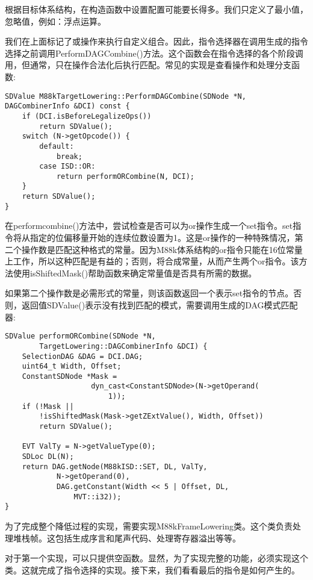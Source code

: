 根据目标体系结构，在构造函数中设置配置可能要长得多。我们只定义了最小值，忽略值，例如：浮点运算。\par

我们在上面标记了或操作来执行自定义组合。因此，指令选择器在调用生成的指令选择之前调用PerformDAGCombine()方法。这个函数会在指令选择的各个阶段调用，但通常，只在操作合法化后执行匹配。常见的实现是查看操作和处理分支函数:\par

\begin{lstlisting}[caption={}]
SDValue M88kTargetLowering::PerformDAGCombine(SDNode *N,
DAGCombinerInfo &DCI) const {
	if (DCI.isBeforeLegalizeOps())
		return SDValue();
	switch (N->getOpcode()) {
		default:
			break;
		case ISD::OR:
			return performORCombine(N, DCI);
	}
	return SDValue();
}
\end{lstlisting}

在performcombine()方法中，尝试检查是否可以为or操作生成一个set指令。set指令将从指定的位偏移量开始的连续位数设置为1。这是or操作的一种特殊情况，第二个操作数是匹配这种格式的常量。因为M88k体系结构的or指令只能在16位常量上工作，所以这种匹配是有益的；否则，将合成常量，从而产生两个or指令。该方法使用isShiftedMask()帮助函数来确定常量值是否具有所需的数据。\par

如果第二个操作数是必需形式的常量，则该函数返回一个表示set指令的节点。否则，返回值SDValue()表示没有找到匹配的模式，需要调用生成的DAG模式匹配器:\par

\begin{lstlisting}[caption={}]
SDValue performORCombine(SDNode *N,
		TargetLowering::DAGCombinerInfo &DCI) {
	SelectionDAG &DAG = DCI.DAG;
	uint64_t Width, Offset;
	ConstantSDNode *Mask =
					dyn_cast<ConstantSDNode>(N->getOperand(
						1));
	if (!Mask ||
		!isShiftedMask(Mask->getZExtValue(), Width, Offset))
		return SDValue();
	
	EVT ValTy = N->getValueType(0);
	SDLoc DL(N);
	return DAG.getNode(M88kISD::SET, DL, ValTy,
			N->getOperand(0),
			DAG.getConstant(Width << 5 | Offset, DL,
				MVT::i32));
}
\end{lstlisting}

为了完成整个降低过程的实现，需要实现M88kFrameLowering类。这个类负责处理堆栈帧。这包括生成序言和尾声代码、处理寄存器溢出等等。\par

对于第一个实现，可以只提供空函数。显然，为了实现完整的功能，必须实现这个类。这就完成了指令选择的实现。接下来，我们看看最后的指令是如何产生的。\par





























